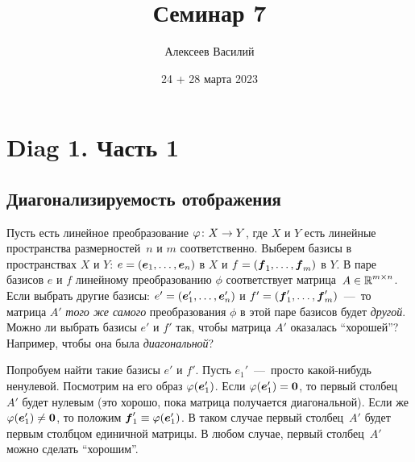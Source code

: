 \documentclass[a4paper,12pt]{article}
\author{Алексеев Василий}
\title{Семинар 7}
\date{24 + 28 марта 2023}
\begin{document}
  \maketitle
  
  \tableofcontents

  \thispagestyle{empty}
  
  \newpage
  


  \section{Diag 1. Часть 1}
  
  \subsection{Диагонализируемость отображения}
  
  Пусть есть линейное преобразование $\phi\colon X \hm\to Y$, где $X$ и $Y$ есть линейные пространства размерностей~$n$ и $m$ соответственно.
  Выберем базисы в пространствах $X$ и $Y$: $e \hm= (\bds e_1, \ldots, \bds e_n)$ в $X$ и $f \hm= (\bds f_1, \ldots, \bds f_m)$ в $Y$.
  В паре базисов $e$ и $f$ линейному преобразованию $\phi$ соответствует матрица~$A \hm\in \RR^{m\times n}$.
  Если выбрать другие базисы: $e' = (\boldsymbol e_1', \ldots, \boldsymbol e_n')$ и $f' = (\boldsymbol f_1', \ldots, \boldsymbol f_m')$~---~то матрица $A'$ \emph{того же самого} преобразования $\phi$ в этой паре базисов будет \emph{другой}.
  Можно ли выбрать базисы $e'$ и $f'$ так, чтобы матрица $A'$ оказалась ``хорошей''?
  Например, чтобы она была \emph{диагональной}?
  
  Попробуем найти такие базисы $e'$ и $f'$.
  Пусть $e_1'$~---~просто какой-нибудь ненулевой.
  Посмотрим на его образ $\varphi(\boldsymbol e_1')$.
  Если $\phi(\bds e_1') \hm= \bds 0$, то первый столбец~$A'$ будет нулевым (это хорошо, пока матрица получается диагональной).
  Если же $\phi(\bds e_1') \hm{\not=} \bds 0$, то положим $\bds f_1' \hm\equiv \phi(\bds e_1')$.
  В таком случае первый столбец~$A'$ будет первым столбцом единичной матрицы.
  В любом случае, первый столбец~$A'$ можно сделать ``хорошим''.
  
\end{document}
